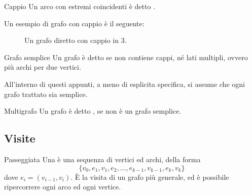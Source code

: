 \documentclass[a4paper, 12pt]{report}
\begin{document}
    \begin{frameddefn}{Cappio}
        Un arco con estremi coincidenti è detto .
    \end{frameddefn}

    \begin{example}
        Un esempio di grafo con cappio è il seguente:

        \begin{figure}[H]
            \centering
            \caption{Un grafo diretto con cappio in 3.}
        \end{figure}
    \end{example}

    \begin{frameddefn}{Grafo semplice}
        Un grafo è detto  se non contiene cappi, né lati multipli, ovvero più archi per due vertici.

        All'interno di questi appunti, a meno di esplicita specifica, si assume che ogni grafo trattato sia semplice.
    \end{frameddefn}

    \begin{frameddefn}{Multigrafo}
        Un grafo è detto , se non è un grafo semplice.
    \end{frameddefn}

    \subsection{Visite}

    \begin{frameddefn}{Passeggiata}
        Una  è una sequenza di vertici ed archi, della forma $$\{v_0, e_1, v_1, e_2, \ldots , e_{k - 1}, v_{k - 1}, e_k, v_k\}$$ dove $e_i=(v_{i - 1}, v_i)$. È la visita di un grafo più generale, ed è possibile ripercorrere ogni arco ed ogni vertice.
    \end{frameddefn}
\end{document}
